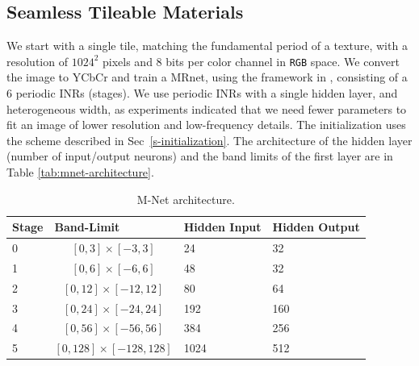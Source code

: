 \subsection{Seamless Tileable Materials}\label{s-multires-2d}

We start with a single tile, matching the fundamental period of a texture, with a resolution of $1024^2$ pixels and $8$ bits per color channel in \texttt{RGB} space. We convert the image to YCbCr and train a MRnet, using the framework in \cite{paz2022}, consisting of a $6$ periodic INRs (stages).
We use periodic INRs with a single hidden layer, and heterogeneous width, as experiments indicated that we need fewer parameters to fit an image of lower resolution and low-frequency details. The initialization uses the scheme described in Sec~\ref{s-initialization}. The architecture of the hidden layer (number of input/output neurons) and the band limits of the first layer are in Table \ref{tab:mnet-architecture}.

\pagebreak

\begin{table}[h]
\small
\begin{tabular}{|l|c|l|l|}
\hline
\textbf{Stage} & \multicolumn{1}{l|}{\textbf{Band-Limit}} & \multicolumn{1}{l|}{\textbf{Hidden Input}} & \multicolumn{1}{l|}{\textbf{Hidden Output}} \\ \hline
 0     & $[0, 3]\times[-3, 3]$                       & 24                                & 32                                 \\
 1     & $[0, 6]\times[-6, 6]$                       & 48                                & 32                                 \\
 2     & $[0, 12]\times[-12, 12]$                     & 80                                & 64                                 \\
 3     & $[0, 24]\times[-24, 24]$                     & 192                               & 160                                \\
 4     & $[0, 56]\times[-56, 56]$                     & 384                               & 256                                \\
 5     & $[0, 128]\times[-128, 128]$                   & 1024                              & 512                                \\ \hline
\end{tabular}
\caption{M-Net architecture.}
\end{table}\label{tab:mnet-architecture}

